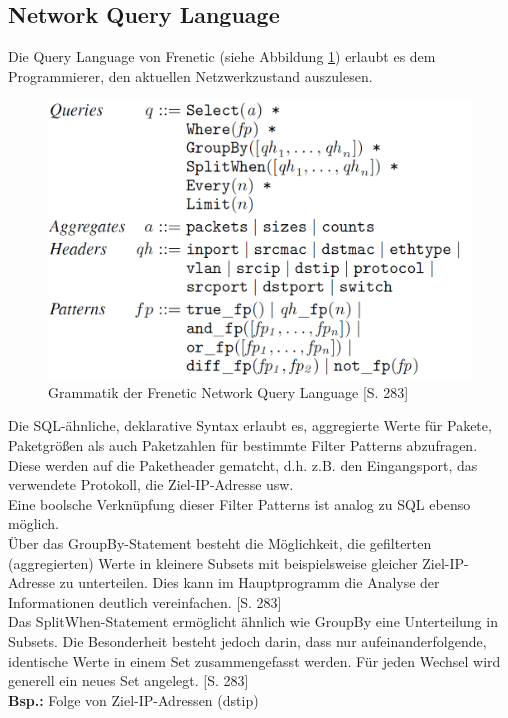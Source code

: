 \documentclass[10pt,conference]{IEEEtran}
\begin{document}
\subsection{Network Query Language}
Die Query Language von Frenetic (siehe Abbildung \ref{fig:freneticQuerySyntax}) erlaubt es dem Programmierer, den aktuellen Netzwerkzustand auszulesen.
\begin{figure}[h]
	\centering
	\includegraphics[width=\columnwidth]{images/freneticQuerySyntax.PNG}
	\caption{Grammatik der Frenetic Network Query Language \cite{4}[S. 283]}
	\label{fig:freneticQuerySyntax}
\end{figure}
\newline
Die SQL-ähnliche, deklarative Syntax erlaubt es, aggregierte Werte für Pakete, Paketgrößen als auch Paketzahlen für bestimmte Filter Patterns abzufragen. Diese werden auf die Paketheader gematcht, d.h. z.B. den Eingangsport, das verwendete Protokoll, die Ziel-IP-Adresse usw.\\ 
Eine boolsche Verknüpfung dieser Filter Patterns ist analog zu SQL ebenso möglich.\\
Über das GroupBy-Statement besteht die Möglichkeit, die gefilterten (aggregierten) Werte in kleinere Subsets mit beispielsweise gleicher Ziel-IP-Adresse zu unterteilen. Dies kann im Hauptprogramm die Analyse der Informationen deutlich vereinfachen. \cite{4}[S. 283]\\
Das SplitWhen-Statement ermöglicht ähnlich wie GroupBy eine Unterteilung in Subsets. Die Besonderheit besteht jedoch darin, dass nur aufeinanderfolgende, identische Werte in einem Set zusammengefasst werden. Für jeden Wechsel wird generell ein neues Set angelegt. \cite{4}[S. 283]\\
\textbf{Bsp.:} Folge von Ziel-IP-Adressen (dstip)
\end{document}
